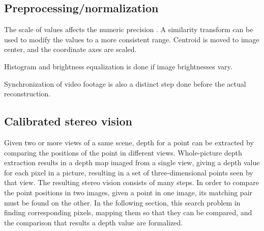 





\subsection{Preprocessing/normalization} %

The scale of values affects the numeric precision \cite{hartley1997defense,hartley03multiview}.
A similarity transform can be used to modify the values to a more consistent range.
Centroid is moved to image center, and the coordinate axes are scaled.


Histogram and brightness equalization is done if image brightnesses vary.

Synchronization of video footage is also a distinct step done before the actual reconstruction.




\subsection{Calibrated stereo vision} %

Given two or more views of a same scene, depth for a point can be extracted by comparing the positions of the point in different views.
Whole-picture depth extraction results in a depth map imaged from a single view, giving a depth value for each pixel in a picture, resulting in a set of three-dimensional points seen by that view.
The resulting stereo vision consists of many steps.
In order to compare the point positions in two images, given a point in one image, its matching pair must be found on the other.
In the following section, this search problem in finding corresponding pixels, mapping them so that they can be compared, and the comparison that results a depth value are formalized.

